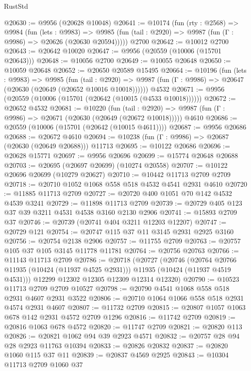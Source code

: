 \begin{lexlean}{RustStd}
\begin{coremodule}
@20630 := @9956 (@20628 @10048)
@20641 := @10174
    (fun (rty : @2568) =>
    @9984
      (fun (lets : @9983) =>
      @9985 (fun (tail : @2920) => @9987 (fun (Γ : @9986) => @20626 (@20630 @20594)))))
    @2700
@20642 := @10012 @2700
@20643 := @20642 @10020
@20647 := @9956 (@20559 (@10006 (@15701 @20643)))
@20648 := @10056 @2700
@20649 := @10055 @20648
@20650 := @10059 @20648
@20652 := @20650 @20589 @15495
@20664 := @10196
    (fun (lets : @9983) =>
    @9985
      (fun (tail : @2920) =>
      @9987 (fun (Γ : @9986) => @20647 (@20630 (@20649 (@20652 @10016 @10018))))))
    @4532
@20671 := @9956 (@20559 (@10006 (@15701 (@20642 (@10015 (@4533 @10018))))))
@20672 := @20652 @4532
@20681 := @10220
    (fun (tail : @2920) => @9987 (fun (Γ : @9986) => @20671 (@20630 (@20649 (@20672 @10018)))))
    @4610
@20686 := @20559 (@10006 (@15701 (@20642 (@10015 @4611))))
@20687 := @9956 @20686
@20688 := @20672 @4610
@20694 := @10238 (fun (Γ : @9986) => @20687 (@20630 (@20649 @20688))) @11713
@20695 := @10122 @20686
@20696 := @20628 @15771
@20697 := @9956 @20696
@20699 := @15774 @20648 @20688
@20703 := @20695 (@20697 @20699) (@10274 @20558)
@20707 := @10122 @20696 @20699 (@10279 @20627)
@20710 := @10442 @11713 @2709 @2709
@20718 := @20710 @1052 @1068 @558 @518 @4532 @4541 @2931 @4610
@20720 := @11885 @11713 @2709
@20727 := @20720 @400 @1051 @70 @142 @4532 @4539 @3241
@20729 := @11898 @11713 @2709
@20739 := @20729 @405 @123 @37 @39 @3211 @4531 @4538 @3160 @2130 @2906
@20741 := @15893 @2709 @37
@20746 := @20739 (@20741 @404 @3211 @12203 @12207)
@20747 := @20729 @121
@20754 := @20747 @115 @37 @11 @3145 @2931 @2925 @3160
@20756 := @20754 @2138 @2906
@20757 := @11755 @2709
@20763 := @20757 @105 @37 @105 @3145 @11778 @11781
@20764 := @20756 @20763
@20766 := @11143 @11713 @2709
@20786 := @20718
    (@20727
      (@20746
        (@20764 @20766 @11935 (@10424 (@11937 @4525 @2931)))
        @11935
        (@10424 (@11937 @4519 @4531)))
      @12299
      @12302
      @12305
      @12309
      @12314
      @12320)
@20790 := @10523 @11713 @2709 @2709 @10527
@20798 := @20790 @4541 @1068 @558 @518 @2931 @4607 @2931 @3522
@20806 := @20710 @1064 @1066 @558 @518 @2931 @4574 @2931 @4607
@20807 := @11732 @2709
@20815 := @20807 @1057 @1063 @678 @142 @2931 @4572 @2709 @1296
@20816 := @11742 @2709
@20819 := @20816 @1063 @678 @4572
@20820 := @11747 @2709
@20821 := @20820 @113
@20826 := @20821 @1062 @94 @39 @2923 @4571
@20832 := @20757 @28 @94 @28 @2923 @11763 @10394
@20833 := @20826 @20832
@20837 := @20820 @1060 @115 @37 @11
@20839 := @20837 @4569 @2925
@20843 := @10304 @11713 @2709 @1060 @37

\end{coremodule}
\end{lexlean}
